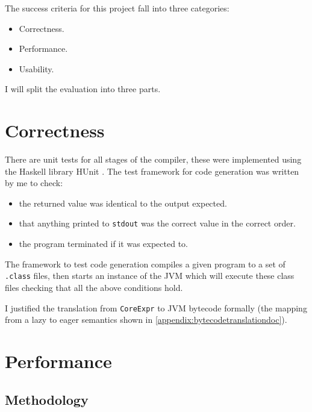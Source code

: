 \documentclass[float=false, crop=false]{standalone}
\begin{document}
The success criteria for this project fall into three categories:
\begin{itemize}
  \item Correctness.
  \item Performance.
  \item Usability.
\end{itemize}
I will split the evaluation into three parts.


\section{Correctness}

There are unit tests for all stages of the compiler, these were implemented 
using the Haskell library HUnit \cite{hunit-lib}. The test framework for code generation
was written by me to check:
\begin{itemize}
  \item the returned value was identical to the output expected. 
  \item that anything printed to \texttt{stdout} was the correct value in the correct order. 
  \item the program terminated if it was expected to.
\end{itemize}
  The framework to test code generation compiles a given program to a set 
  of \texttt{.class} files, then 
  starts an instance of the JVM which will execute these class files
  checking that all the above conditions hold.

  I justified the translation from \verb|CoreExpr| to JVM bytecode
  formally (the mapping from a lazy to eager
  semantics shown in \cref{appendix:bytecodetranslationdoc}).

\section{Performance}

\subsection{Methodology}
\end{document}

